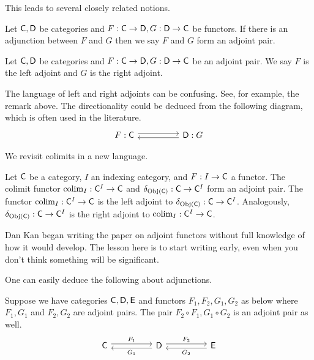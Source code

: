 This leads to several closely related notions. 
\begin{definition}
  Let $\mathsf{C},\mathsf{D}$ be categories and $F:\mathsf{C}\to\mathsf{D},G:\mathsf{D}\to\mathsf{C}$ be functors. If there is an adjunction between $F$ and $G$ then we say $F$ and $G$ form an adjoint pair. 
\end{definition}
\begin{definition}
  Let $\mathsf{C},\mathsf{D}$ be categories and $F:\mathsf{C}\to\mathsf{D},G:\mathsf{D}\to\mathsf{C}$ be an adjoint pair. We say $F$ is the left adjoint and $G$ is the right adjoint. 
\end{definition}
\begin{remark}
  The language of left and right adjoints can be confusing. See, for example, the remark above. The directionality could be deduced from the following diagram, which is often used in the literature. 
  $$%
  \begin{tikzcd}
    {F:\Csf} && {\Dsf:G}
    \arrow[shift left, from=1-3, to=1-1]
    \arrow[shift left, from=1-1, to=1-3]
  \end{tikzcd}$$
\end{remark}
We revisit colimits in a new language. 
\begin{example}
  Let $\mathsf{C}$ be a category, $I$ an indexing category, and $F:I\to\mathsf{C}$ a functor. The colimit functor $\mathrm{colim}_{I}:\mathsf{C}^{I}\to\mathsf{C}$ and $\delta_{\mathrm{Obj}(\mathsf{C})}:\mathsf{C}\to\mathsf{C}^{I}$ form an adjoint pair. The functor $\mathrm{colim}_{I}:\mathsf{C}^{I}\to\mathsf{C}$ is the left adjoint to $\delta_{\mathrm{Obj}(\mathsf{C})}:\mathsf{C}\to\mathsf{C}^{I}$. Analogously, $\delta_{\mathrm{Obj}(\mathsf{C})}:\mathsf{C}\to\mathsf{C}^{I}$ is the right adjoint to $\mathrm{colim}_{I}:\mathsf{C}^{I}\to\mathsf{C}$. 
\end{example}
\begin{remark}
  Dan Kan began writing the paper on adjoint functors without full knowledge of how it would develop. The lesson here is to start writing early, even when you don't think something will be significant. 
\end{remark}
One can easily deduce the following about adjunctions. 
\begin{proposition}
  Suppose we have categories $\mathsf{C},\mathsf{D},\mathsf{E}$ and functors $F_{1},F_{2},G_{1},G_{2}$ as below where $F_{1},G_{1}$ and $F_{2},G_{2}$ are adjoint pairs. The pair $F_{2}\circ F_{1}, G_{1}\circ G_{2}$ is an adjoint pair as well. 
  $$%
  \begin{tikzcd}
    \Csf && \Dsf && \Esf
    \arrow["{F_{1}}", shift left, from=1-1, to=1-3]
    \arrow["{F_{2}}", shift left, from=1-3, to=1-5]
    \arrow["{G_{2}}", shift left, from=1-5, to=1-3]
    \arrow["{G_{1}}", shift left, from=1-3, to=1-1]
  \end{tikzcd}$$
\end{proposition}
